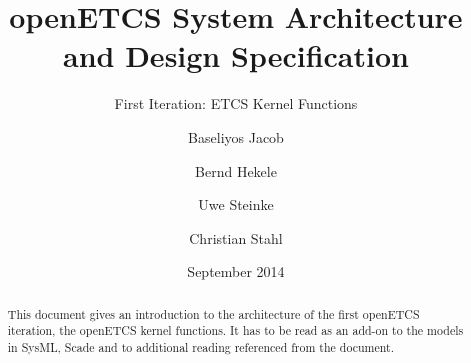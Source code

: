 \documentclass{template/openetcs_article}
\begin{document}
\frontmatter
{}


%




\title{openETCS System Architecture and Design Specification}

\subtitle{First Iteration: ETCS Kernel Functions}

\date{September 2014}



\techassessoraffil{[affiliation]}





\author{Baseliyos Jacob}


\author{Bernd Hekele}


\author{Uwe Steinke}


\author{Christian Stahl}






\begin{abstract}
This document gives an introduction to the architecture of the first openETCS iteration, the openETCS kernel functions. It has to be read as an add-on to the models in SysML, Scade and to additional reading referenced from the document.
\end{abstract}
\end{document}
